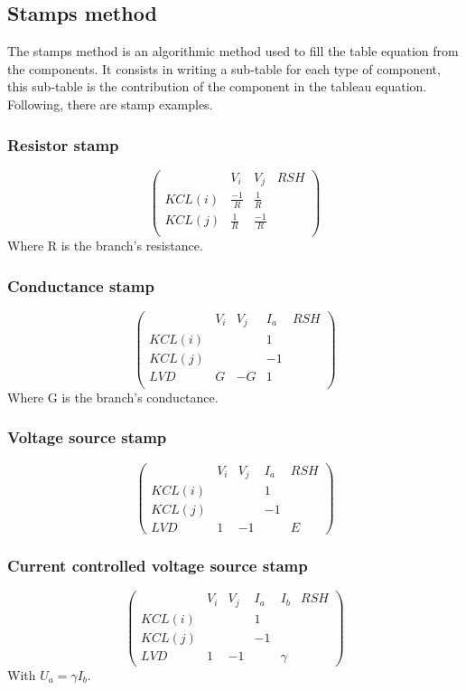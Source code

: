 \subsection{Stamps method}
The stamps method is an algorithmic method used to fill the table equation from the components. It
consists in writing a sub-table for each type of component, this sub-table is the contribution of the component in the tableau equation.\\
Following, there are stamp examples.
\subsubsection{Resistor stamp}
\[\left(\begin{array}{cccc}
&V_{i}&V_{j}&RSH\\
  \hline
  KCL(i)&\frac{-1}{R}&\frac{1}{R}&\\
  KCL(j)&\frac{1}{R}&\frac{-1}{R}&\\
  \end{array}\right)
\]
Where R is the branch's resistance.
\subsubsection{Conductance stamp}
\[\left(\begin{array}{ccccc}
&V_{i}&V_{j}&I_{a}&RSH\\
  \hline
  KCL(i)&&&1&\\
  KCL(j)&&&-1&\\
  LVD&G&-G&1&\\
  \end{array}\right)
\]
Where G is the branch's conductance.
\subsubsection{Voltage source stamp}
\[\left(\begin{array}{ccccc}
&V_{i}&V_{j}&I_{a}&RSH\\
  \hline
  KCL(i)&&&1\\
  KCL(j)&&&-1\\
  LVD&1&-1&&E
  \end{array}\right)
\]
\subsubsection{Current controlled voltage source stamp}
\[\left(\begin{array}{cccccc}
&V_{i}&V_{j}&I_{a}&I_{b}&RSH\\
  \hline
  KCL(i)&&&1&\\
  KCL(j)&&&-1&\\
  LVD&1&-1&&\gamma
  \end{array}\right)
\]
With $U_{a} = \gamma I_{b}$.

